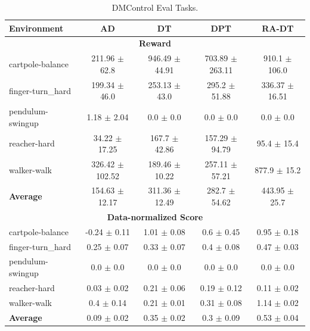 \documentclass{article}
\begin{document}
\begin{table}[h]
    \centering
    \caption{DMControl Eval Tasks.}
\begin{tabular}{lcccc}
    \toprule
    \textbf{Environment}                    &  \textbf{AD}        & \textbf{DT} & \textbf{DPT} & \textbf{RA-DT} \\
    \midrule
    \multicolumn{5}{c}{\textbf{Reward}} \\
    cartpole-balance                                             & 211.96 $\pm$ 62.8   & 946.49 $\pm$ 44.91  & 703.89 $\pm$ 263.11 & 910.1 $\pm$ 106.0    \\
    finger-turn\_hard                                            & 199.34 $\pm$ 46.0   & 253.13 $\pm$ 43.0   & 295.2 $\pm$ 51.88   & 336.37 $\pm$ 16.51  \\
    pendulum-swingup                                             & 1.18 $\pm$ 2.04     & 0.0 $\pm$ 0.0       & 0.0 $\pm$ 0.0       & 0.0 $\pm$ 0.0       \\
    reacher-hard                                                 & 34.22 $\pm$ 17.25   & 167.7 $\pm$ 42.86  & 157.29 $\pm$ 94.79 & 95.4 $\pm$ 15.4    \\
    walker-walk                                                  & 326.42 $\pm$ 102.52 & 189.46 $\pm$ 10.22  & 257.11 $\pm$ 57.21  & 877.9 $\pm$ 15.2    \\
    \textbf{Average}                                             &         154.63 $\pm$ 12.17 &        311.36 $\pm$ 12.49 &        282.7 $\pm$ 54.62 &       443.95 $\pm$ 25.7 \\
    \midrule
    \multicolumn{5}{c}{\textbf{Data-normalized Score}} \\
    cartpole-balance                                             & -0.24 $\pm$ 0.11  & 1.01 $\pm$ 0.08   & 0.6 $\pm$ 0.45   & 0.95 $\pm$ 0.18   \\
    finger-turn\_hard                                            & 0.25 $\pm$ 0.07   & 0.33 $\pm$ 0.07   & 0.4 $\pm$ 0.08   & 0.47 $\pm$ 0.03   \\
    pendulum-swingup                                             & 0.0 $\pm$ 0.0     & 0.0 $\pm$ 0.0     & 0.0 $\pm$ 0.0     & 0.0 $\pm$ 0.0     \\
    reacher-hard                                                 & 0.03 $\pm$ 0.02   & 0.21 $\pm$ 0.06   & 0.19 $\pm$ 0.12  & 0.11 $\pm$ 0.02   \\
    walker-walk                                                  & 0.4 $\pm$ 0.14    & 0.21 $\pm$ 0.01   & 0.31 $\pm$ 0.08   & 1.14 $\pm$ 0.02   \\
    \textbf{Average}    &   0.09 $\pm$ 0.02 &           0.35 $\pm$ 0.02 &    0.3 $\pm$ 0.09   &   0.53 $\pm$ 0.04 \\
    \bottomrule
    \end{tabular}
    \label{tab:dmcontrol-eval}
\end{table}
\end{document}
